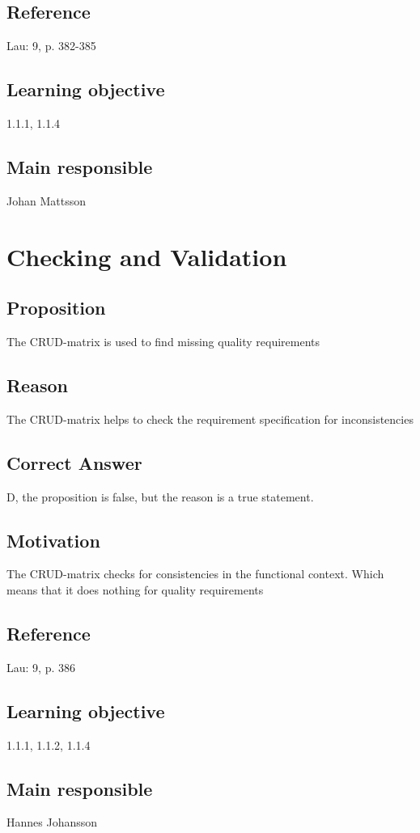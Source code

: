 \documentclass[a4paper]{article}
\begin{document}
\subsection*{Reference}
Lau: 9, p. 382-385
\subsection*{Learning objective}
1.1.1, 1.1.4
\subsection*{Main responsible}
Johan Mattsson

\section{Checking and Validation}
\subsection*{Proposition}
The CRUD-matrix is used to find missing quality requirements
\subsection*{Reason}
The CRUD-matrix helps to check the requirement specification for inconsistencies 
\subsection*{Correct Answer}
D, the proposition is false, but the reason is a true statement.
\subsection*{Motivation}
The CRUD-matrix checks for consistencies in the functional context. Which means that it does nothing for quality requirements
\subsection*{Reference}
Lau: 9, p. 386
\subsection*{Learning objective}
1.1.1, 1.1.2, 1.1.4
\subsection*{Main responsible}
Hannes Johansson

\end{document}
